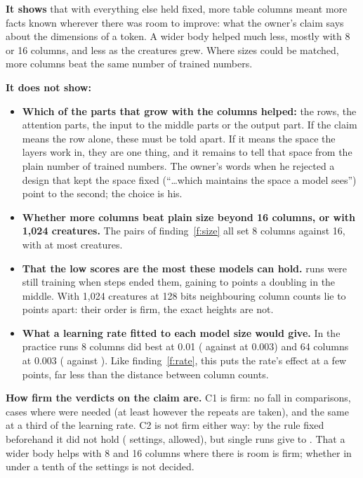 \documentclass[10pt,letterpaper]{article}
\newcounter{finding}
\newcommand{\lead}[1]{\textbf{#1}}               %
\begin{document}
\lead{It shows} that with everything else held fixed, more table columns meant more facts known wherever there
was room to improve: what the owner's claim says about the dimensions of a token. A wider body helped much
less, mostly with 8 or 16 columns, and less as the creatures grew. Where sizes could be matched, more columns
beat the same number of trained numbers.

\lead{It does not show:}
\begin{itemize}
\item \lead{Which of the parts that grow with the columns helped:} the rows, the attention parts, the input to
      the middle parts or the output part. If the claim means the row alone, these must be told apart. If it
      means the space the layers work in, they are one thing, and it remains to tell that space from the plain
      number of trained numbers. The owner's words when he rejected a design that kept the space fixed
      (``\dots which maintains the space a model sees'') point to the second; the choice is his.
\item \lead{Whether more columns beat plain size beyond 16 columns, or with 1,024 creatures.} The
      \SameSizePairs{} pairs of finding~\ref{f:size} all set 8 columns against 16, with at most
      \SameSizeMostCreatures{} creatures.
\item \lead{That the low scores are the most these models can hold.} \LimitRuns{} runs were still training
      when \Limit{} steps ended them, gaining \LimitGainLow{} to \LimitGainHigh{} points a doubling in the
      middle. With 1,024 creatures at 128 bits neighbouring column counts lie \TypicalGapLow{} to
      \TypicalGapHigh{} points apart: their order is firm, the exact heights are not.
\item \lead{What a learning rate fitted to each model size would give.} In the practice runs 8 columns did
      best at 0.01 (\PracticeEightMid{} against \PracticeEightLow{} at 0.003) and 64 columns at 0.003
      (\PracticeSixtyFourLow{} against \PracticeSixtyFourMid). Like finding~\ref{f:rate}, this puts the rate's
      effect at a few points, far less than the distance between column counts.
\end{itemize}

\lead{How firm the verdicts on the claim are.} C1 is firm: no fall in \COneComparisons{} comparisons, \COneGained{}
cases where \COneNeeded{} were needed (at least \COneRunLow{} however the repeats are taken), and the same at a
third of the learning rate. C2 is not firm either way: by the rule fixed beforehand it did not hold
(\CTwoGained{} settings, \CTwoAllowed{} allowed), but single runs give \CTwoRunLow{} to \CTwoRunHigh. That a
wider body helps with 8 and 16 columns where there is room is firm; whether in under a tenth of the settings
is not decided.
\end{document}
